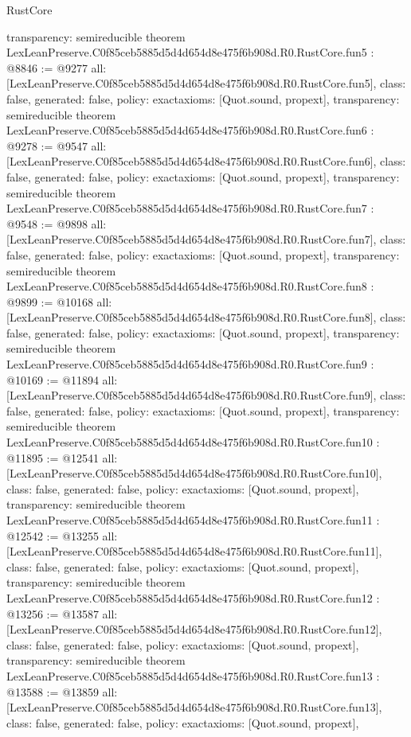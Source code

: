 \begin{lexlean}{RustCore}
\begin{coremodule}
{  transparency: semireducible
}
theorem LexLeanPreserve.C0f85ceb5885d5d4d654d8e475f6b908d.R0.RustCore.fun5 : @8846 := @9277 {
  all: [LexLeanPreserve.C0f85ceb5885d5d4d654d8e475f6b908d.R0.RustCore.fun5],
  class: false,
  generated: false,
  policy: exact{axioms: [Quot.sound, propext]},
  transparency: semireducible
}
theorem LexLeanPreserve.C0f85ceb5885d5d4d654d8e475f6b908d.R0.RustCore.fun6 : @9278 := @9547 {
  all: [LexLeanPreserve.C0f85ceb5885d5d4d654d8e475f6b908d.R0.RustCore.fun6],
  class: false,
  generated: false,
  policy: exact{axioms: [Quot.sound, propext]},
  transparency: semireducible
}
theorem LexLeanPreserve.C0f85ceb5885d5d4d654d8e475f6b908d.R0.RustCore.fun7 : @9548 := @9898 {
  all: [LexLeanPreserve.C0f85ceb5885d5d4d654d8e475f6b908d.R0.RustCore.fun7],
  class: false,
  generated: false,
  policy: exact{axioms: [Quot.sound, propext]},
  transparency: semireducible
}
theorem LexLeanPreserve.C0f85ceb5885d5d4d654d8e475f6b908d.R0.RustCore.fun8 : @9899 := @10168 {
  all: [LexLeanPreserve.C0f85ceb5885d5d4d654d8e475f6b908d.R0.RustCore.fun8],
  class: false,
  generated: false,
  policy: exact{axioms: [Quot.sound, propext]},
  transparency: semireducible
}
theorem LexLeanPreserve.C0f85ceb5885d5d4d654d8e475f6b908d.R0.RustCore.fun9 : @10169 := @11894 {
  all: [LexLeanPreserve.C0f85ceb5885d5d4d654d8e475f6b908d.R0.RustCore.fun9],
  class: false,
  generated: false,
  policy: exact{axioms: [Quot.sound, propext]},
  transparency: semireducible
}
theorem LexLeanPreserve.C0f85ceb5885d5d4d654d8e475f6b908d.R0.RustCore.fun10 : @11895 := @12541 {
  all: [LexLeanPreserve.C0f85ceb5885d5d4d654d8e475f6b908d.R0.RustCore.fun10],
  class: false,
  generated: false,
  policy: exact{axioms: [Quot.sound, propext]},
  transparency: semireducible
}
theorem LexLeanPreserve.C0f85ceb5885d5d4d654d8e475f6b908d.R0.RustCore.fun11 : @12542 := @13255 {
  all: [LexLeanPreserve.C0f85ceb5885d5d4d654d8e475f6b908d.R0.RustCore.fun11],
  class: false,
  generated: false,
  policy: exact{axioms: [Quot.sound, propext]},
  transparency: semireducible
}
theorem LexLeanPreserve.C0f85ceb5885d5d4d654d8e475f6b908d.R0.RustCore.fun12 : @13256 := @13587 {
  all: [LexLeanPreserve.C0f85ceb5885d5d4d654d8e475f6b908d.R0.RustCore.fun12],
  class: false,
  generated: false,
  policy: exact{axioms: [Quot.sound, propext]},
  transparency: semireducible
}
theorem LexLeanPreserve.C0f85ceb5885d5d4d654d8e475f6b908d.R0.RustCore.fun13 : @13588 := @13859 {
  all: [LexLeanPreserve.C0f85ceb5885d5d4d654d8e475f6b908d.R0.RustCore.fun13],
  class: false,
  generated: false,
  policy: exact{axioms: [Quot.sound, propext]},
}
\end{coremodule}
\end{lexlean}
